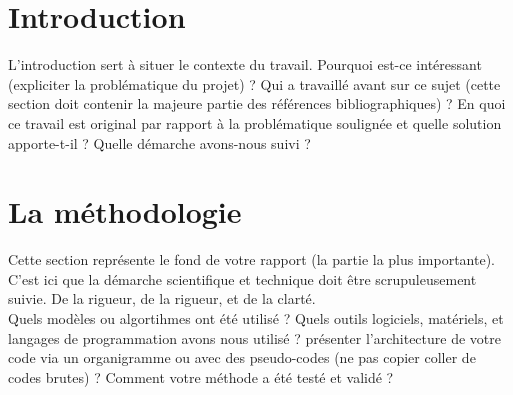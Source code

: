 \documentclass{rapportcs}
\begin{document}
    \begingroup %
    \color{blue}
    \tabledematieres %
    \endgroup




    \section{Introduction}

    L'introduction sert à situer le contexte du travail. Pourquoi est-ce intéressant (expliciter la problématique du projet)  ? Qui a travaillé avant sur ce sujet (cette section doit contenir la majeure partie des références bibliographiques) ? En quoi ce travail est original par rapport à la problématique soulignée et quelle solution apporte-t-il ? Quelle
    démarche avons-nous suivi ?


    \section{La méthodologie}
    Cette section représente le fond de votre rapport (la partie la plus importante). C'est ici que la démarche scientifique et technique doit être scrupuleusement suivie. De la rigueur, de la rigueur, et de la clarté. \\
    Quels modèles ou algortihmes ont été utilisé ?
    Quels outils logiciels, matériels, et langages de programmation avons nous utilisé ?
    présenter l'architecture de votre code via un organigramme ou avec des pseudo-codes (ne pas copier coller de codes brutes) ?
    Comment votre méthode a été testé et validé ?
\end{document}
